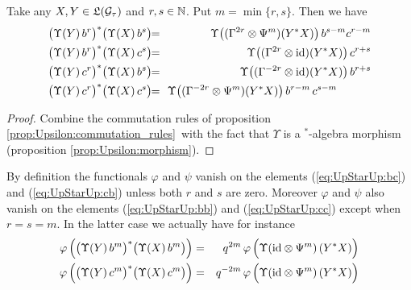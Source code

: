 \begin{lemma}  \label{lem:Haar_on_UpStarUp}
  Take any\/ $X,Y\in \mathfrak{L}(\mathcal G_\tau)$ and\/ $r, s \in \mathbb{N}$. Put\/ $m=\min\{r,s\}$.
  Then we have
\begin{eqnarray}
   \left(\Upsilon(Y)\, b^r \vertM\right)^*\!
     \left(\Upsilon(X)\, b^s
           \vertM\right)
   \!\!&=&\!\!
    \Upsilon\!\left((\Gamma^{2r} \tens \Psi^m)(Y^* X) \vertM\right)
     b^{s-m} c^{r-m}
  \label{eq:UpStarUp:bb} \\
  \left(\Upsilon(Y)\, b^r  \vertM\right)^* \!
  \left(\Upsilon(X)\, c^s  \vertM\right)
   \!\!&=&\!\!
  \Upsilon\!\left((\Gamma^{2r} \tens \id)(Y^* X) \vertM\right)
      c^{r + s}
  \label{eq:UpStarUp:bc} \\
  \left(\Upsilon(Y)\, c^r \vertM\right)^* \!
  \left(\Upsilon(X)\, b^s  \vertM\right)
   \!\!&=&\!\!
   \Upsilon\!\left((\Gamma^{-2r} \tens \id)(Y^* X) \vertM\right)
      b^{r + s}
  \label{eq:UpStarUp:cb} \\
  \left(\Upsilon(Y)\, c^r  \vertM\right)^* \!
  \left(\Upsilon(X)\, c^s  \vertM\right)
  \!\!&=&\!\!
   \Upsilon\!\left((\Gamma^{-2r} \tens \Psi^m)(Y^* X) \vertM\right)
      b^{r-m} \, c^{s-m} \hspace{3em}
  \label{eq:UpStarUp:cc}
\end{eqnarray}
\end{lemma}
\begin{proof}
  Combine the commutation rules of proposition
  \ref{prop:Upsilon:commutation_rules}\ with the fact that $\Upsilon$
  is a $^*$-algebra morphism (proposition \ref{prop:Upsilon:morphism}).
\end{proof}



\begin{cor} \label{cor:Haar_on_UpStarUp}
  By definition the functionals\/ $\varphi$ and\/ $\psi$ vanish on the elements
  (\ref{eq:UpStarUp:bc}) and (\ref{eq:UpStarUp:cb}) unless both\/ $r$ and
  $s$ are zero. Moreover\/ $\varphi$ and\/ $\psi$ also vanish on the elements
  (\ref{eq:UpStarUp:bb}) and (\ref{eq:UpStarUp:cc}) except when\/ $r=s=m$.
  In the latter case we actually have for instance
\begin{eqnarray*}
    \varphi\left(
       \left(\Upsilon(Y)\, b^m  \vertM\right)^* \!
       \left(\Upsilon(X)\, b^m  \vertM\right)\right)
    &=& \;\: q^{2m} \,\varphi \left(
      \Upsilon\!\left(\id \tens \Psi^m \right)(Y^* X) \vertL\right) \\
   \varphi\left(
       \left(\Upsilon(Y)\, c^m  \vertM\right)^* \!
       \left(\Upsilon(X)\, c^m  \vertM\right)\right)
    &=& q^{-2m}  \,\varphi \left(
      \Upsilon\!\left(\id \tens \Psi^m \right)(Y^* X)  \vertL\right)
\end{eqnarray*}
\end{cor}

